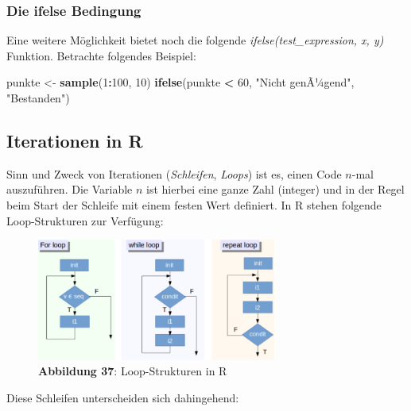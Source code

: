 \documentclass[]{article}
\newenvironment{Shaded}{\begin{snugshade}}{\end{snugshade}}
\newcommand{\KeywordTok}[1]{\textcolor[rgb]{0.13,0.29,0.53}{\textbf{#1}}}
\newcommand{\DecValTok}[1]{\textcolor[rgb]{0.00,0.00,0.81}{#1}}
\newcommand{\StringTok}[1]{\textcolor[rgb]{0.31,0.60,0.02}{#1}}
\newcommand{\OperatorTok}[1]{\textcolor[rgb]{0.81,0.36,0.00}{\textbf{#1}}}
\newcommand{\NormalTok}[1]{#1}
\begin{document}
\subsubsection*{Die ifelse Bedingung}\label{die-ifelse-bedingung}

Eine weitere Möglichkeit bietet noch die folgende
\emph{ifelse(test\_expression, x, y)} Funktion. Betrachte folgendes
Beispiel:

\begin{Shaded}
\begin{Highlighting}[]
\NormalTok{  punkte <-}\StringTok{ }\KeywordTok{sample}\NormalTok{(}\DecValTok{1}\OperatorTok{:}\DecValTok{100}\NormalTok{, }\DecValTok{10}\NormalTok{)}
  \KeywordTok{ifelse}\NormalTok{(punkte }\OperatorTok{<}\StringTok{ }\DecValTok{60}\NormalTok{, }\StringTok{"Nicht genÃ¼gend"}\NormalTok{, }\StringTok{"Bestanden"}\NormalTok{)}
\end{Highlighting}
\end{Shaded}

\subsection*{Iterationen in R}\label{iterationen-in-r}

Sinn und Zweck von Iterationen (\emph{Schleifen}, \emph{Loops}) ist es,
einen Code \(n\)-mal auszuführen. Die Variable \(n\) ist hierbei eine
ganze Zahl (integer) und in der Regel beim Start der Schleife mit einem
festen Wert definiert. In R stehen folgende Loop-Strukturen zur
Verfügung:

\begin{figure}
\centering
\includegraphics[width=0.70000\textwidth]{Images/10_R_Loops.PNG}
\caption{\textbf{Abbildung 37}: Loop-Strukturen in R}
\end{figure}

Diese Schleifen unterscheiden sich dahingehend:
\end{document}
